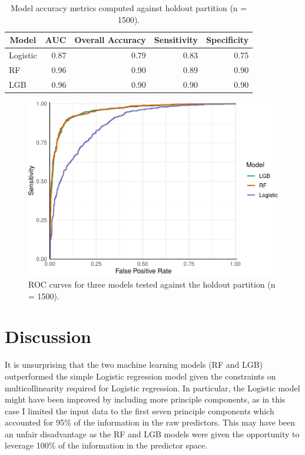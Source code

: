 \documentclass[]{elsarticle} %
\begin{document}
\begin{table}

\caption{\label{tab:metrics}Model accuracy metrics computed against holdout partition (n = 1500).}
\centering
\fontsize{12}{14}\selectfont
\begin{tabular}[t]{lrrrr}
\toprule
\multicolumn{1}{c}{Model} & \multicolumn{1}{c}{AUC} & \multicolumn{1}{c}{Overall Accuracy} & \multicolumn{1}{c}{Sensitivity} & \multicolumn{1}{c}{Specificity}\\
\midrule
Logistic & 0.87 & 0.79 & 0.83 & 0.75\\
\addlinespace
RF & 0.96 & 0.90 & 0.89 & 0.90\\
\addlinespace
LGB & 0.96 & 0.90 & 0.90 & 0.90\\
\bottomrule
\end{tabular}
\end{table}

\begin{figure}
\includegraphics[width=1\linewidth]{report_files/figure-latex/roc-1} \caption{ROC curves for three models tested against the holdout partition (n = 1500).}\label{fig:roc}
\end{figure}

\hypertarget{discussion}{%
\section{Discussion}\label{discussion}}

It is unsurprising that the two machine learning models (RF and LGB)
outperformed the simple Logistic regression model given the constraints
on multicollinearity required for Logistic regression.
In particular, the Logistic model might have been improved by including more
principle components, as in this case I limited the input data to the first
seven principle components which accounted for 95\% of the information in the
raw predictors.
This may have been an unfair disadvantage as the RF and LGB models were given
the opportunity to leverage 100\% of the information in the predictor space.
\end{document}
